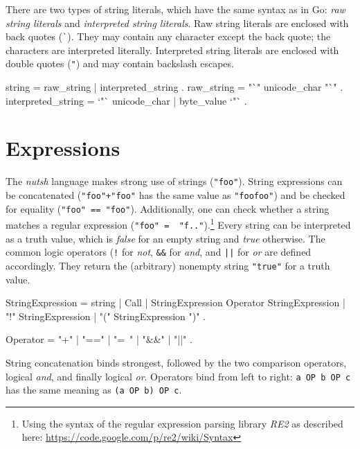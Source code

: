\documentclass[paper=a4,twoside,abstract=on,cleardoublepage=empty,numbers=noenddot,toc=bib,12pt,appendixprefix=true]{scrreprt}
\begin{document}

There are two types of string literals, which have the same syntax as in Go: \emph{raw string literals} and \emph{interpreted string literals}. Raw string literals are enclosed with back quotes (\texttt{\`}). They may contain any character except the back quote; the characters are interpreted literally. Interpreted string literals are enclosed with double quotes (\texttt{"}) and may contain backslash escapes.

\begin{ebnf}
string = raw_string | interpreted_string .
raw_string = "`" { unicode_char } "`" .
interpreted_string = `"` { unicode_char | byte_value } `"` .
\end{ebnf}

\section{Expressions}


The \emph{nutsh} language makes strong use of strings (\texttt{"foo"}). String expressions can be concatenated (\texttt{"foo"+"foo"} has the same value as \texttt{"foofoo"}) and be checked for equality (\texttt{"foo" == "foo"}). Additionally, one can check whether a string matches a regular expression (\texttt{"foo" =~ "f.."}).\footnote{Using the syntax of the regular expression parsing library \emph{RE2} as described here: \url{https://code.google.com/p/re2/wiki/Syntax}} Every string can be interpreted as a truth value, which is \emph{false} for an empty string and \emph{true} otherwise. The common logic operators (\texttt{!} for \emph{not}, \texttt{\&\&} for \emph{and}, and \texttt{||} for \emph{or} are defined accordingly. They return the (arbitrary) nonempty string \texttt{"true"} for a truth value.

\begin{ebnf}
StringExpression =
        string | Call | StringExpression Operator StringExpression |
        "!" StringExpression | "(" StringExpression ")" .

Operator = "+" | "==" | "=~" | "&&" | "||" .
\end{ebnf}


String concatenation binds strongest, followed by the two comparison operators, logical \emph{and}, and finally logical \emph{or}. Operators bind from left to right: \texttt{a OP b OP c} has the same meaning as \texttt{(a OP b) OP c}.
\end{document}
